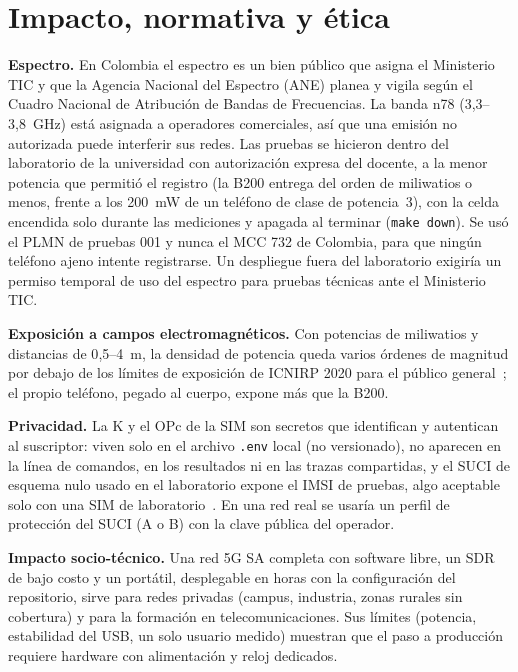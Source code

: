 \documentclass[conference]{IEEEtran}
\begin{document}
\section{Impacto, normativa y ética}
\label{sec:etica}

\textbf{Espectro.} En Colombia el espectro es un bien público que asigna el Ministerio TIC y que la Agencia Nacional del Espectro (ANE) planea y vigila según el Cuadro Nacional de Atribución de Bandas de Frecuencias. La banda n78 (3{,}3--3{,}8~GHz) está asignada a operadores comerciales, así que una emisión no autorizada puede interferir sus redes. Las pruebas se hicieron dentro del laboratorio de la universidad con autorización expresa del docente, a la menor potencia que permitió el registro (la B200 entrega del orden de miliwatios o menos, frente a los 200~mW de un teléfono de clase de potencia~3), con la celda encendida solo durante las mediciones y apagada al terminar (\texttt{make down}). Se usó el PLMN de pruebas 001 y nunca el MCC 732 de Colombia, para que ningún teléfono ajeno intente registrarse. Un despliegue fuera del laboratorio exigiría un permiso temporal de uso del espectro para pruebas técnicas ante el Ministerio TIC.

\textbf{Exposición a campos electromagnéticos.} Con potencias de miliwatios y distancias de 0{,}5--4~m, la densidad de potencia queda varios órdenes de magnitud por debajo de los límites de exposición de ICNIRP 2020 para el público general~\cite{icnirp}; el propio teléfono, pegado al cuerpo, expone más que la B200.

\textbf{Privacidad.} La K y el OPc de la SIM son secretos que identifican y autentican al suscriptor: viven solo en el archivo \texttt{.env} local (no versionado), no aparecen en la línea de comandos, en los resultados ni en las trazas compartidas, y el SUCI de esquema nulo usado en el laboratorio expone el IMSI de pruebas, algo aceptable solo con una SIM de laboratorio~\cite{ley1581}. En una red real se usaría un perfil de protección del SUCI (A o B) con la clave pública del operador.

\textbf{Impacto socio-técnico.} Una red 5G SA completa con software libre, un SDR de bajo costo y un portátil, desplegable en horas con la configuración del repositorio, sirve para redes privadas (campus, industria, zonas rurales sin cobertura) y para la formación en telecomunicaciones. Sus límites (potencia, estabilidad del USB, un solo usuario medido) muestran que el paso a producción requiere hardware con alimentación y reloj dedicados.
\end{document}
